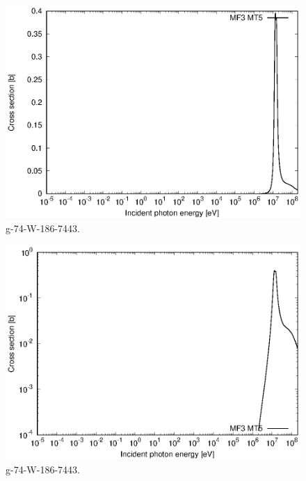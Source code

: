 \begin{figure}
 \includegraphics[width=\linewidth]{eps/g_74-W-186_7443.eps}
  \caption{g-74-W-186-7443.}
\end{figure}
\begin{figure}
 \includegraphics[width=\linewidth]{eps-log/g_74-W-186_7443.eps}
 \caption{g-74-W-186-7443.}
\end{figure}
\newpage \clearpage

